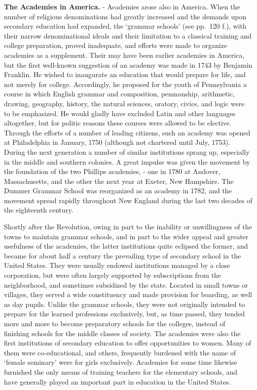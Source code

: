 \documentclass[]{book}
\begin{document}
\textbf{The Academies in America.} - Academies arose also in America. When the number of religious denominations had greatly increased and the demands upon secondary education had expanded, the `grammar schools' (see pp.~120 f.), with their narrow denominational ideals and their limitation to a classical training and college preparation, proved inadequate, and efforts were made to organize academies as a supplement. Their may have been earlier academies in America, but the first well-known suggestion of an academy was made in 1743 by Benjamin Franklin. He wished to inaugurate an education that would prepare for life, and not merely for college. Accordingly, he proposed for the youth of Pennsylvania a course in which English grammar and composition, penmanship, arithmetic, drawing, geography, history, the natural sciences, oratory, civics, and logic were to be emphasized. He would gladly have excluded Latin and other languages altogether, but for politic reasons these courses were allowed to be elective. Through the efforts of a number of leading citizens, such an academy was opened at Philadelphia in January, 1750 (although not chartered until July, 1753). During the next generation a number of similar institutions sprang up, especially in the middle and southern colonies. A great impulse was given the movement by the foundation of the two Phillips academies, - one in 1780 at Andover, Massachusetts, and the other the next year at Exeter, New Hampshire. The Dummer Grammar School was reorganized as an academy in 1782, and the movement spread rapidly throughout New England during the last two decades of the eighteenth century.

Shortly after the Revolution, owing in part to the inability or unwillingness of the towns to maintain grammar schools, and in part to the wider appeal and greater usefulness of the academies, the latter institutions quite eclipsed the former, and became for about half a century the prevailing type of secondary school in the United States. They were usually endowed institutions managed by a close corporation, but were often largely supported by subscriptions from the neighborhood, and sometimes subsidized by the state. Located in small towns or villages, they served a wide constituency and made provision for boarding, as well as day pupils. Unlike the grammar schools, they were not originally intended to prepare for the learned professions exclusively, but, as time passed, they tended more and more to become preparatory schools for the colleges, instead of finishing schools for the middle classes of society. The academies were also the first institutions of secondary education to offer opportunities to women. Many of them were co-educational, and others, frequently burdened with the name of `female seminary' were for girls exclusively. Academies for some time likewise furnished the only means of training teachers for the elementary schools, and have generally played an important part in education in the United States.
\end{document}
